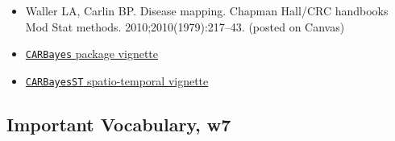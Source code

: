 \documentclass[
]{book}
\newcommand{\passthrough}[1]{#1}
\providecommand{\tightlist}{%
  \setlength{\itemsep}{0pt}\setlength{\parskip}{0pt}}
\begin{document}
\begin{itemize}
\tightlist
\item
  Waller LA, Carlin BP. Disease mapping. Chapman Hall/CRC handbooks Mod Stat methods. 2010;2010(1979):217--43. (posted on Canvas)
\item
  \href{https://cran.r-project.org/web/packages/CARBayes/vignettes/CARBayes.pdf}{\passthrough{\lstinline!CARBayes!} package vignette}
\item
  \href{https://cran.r-project.org/web/packages/CARBayesST/vignettes/CARBayesST.pdf}{\passthrough{\lstinline!CARBayesST!} spatio-temporal vignette}
\end{itemize}

\hypertarget{important-vocabulary-w7}{%
\subsection{Important Vocabulary, w7}\label{important-vocabulary-w7}}

 
  \providecommand{\huxb}[2]{\arrayrulecolor[RGB]{#1}\global\arrayrulewidth=#2pt}
  \providecommand{\huxvb}[2]{\color[RGB]{#1}\vrule width #2pt}
  \providecommand{\huxtpad}[1]{\rule{0pt}{#1}}
  \providecommand{\huxbpad}[1]{\rule[-#1]{0pt}{#1}}
\end{document}
